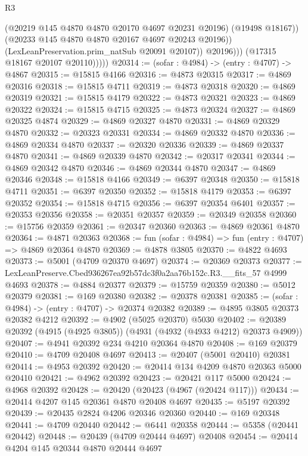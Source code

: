 \begin{lexlean}{R3}
\begin{coremodule}
                        (@20219 @145 @4870 @4870 @20170 @4697 @20231 @20196)
                        (@19498 @18167))
                      (@20233 @145 @4870 @4870 @20167 @4697 @20243 @20196))
                    (LexLeanPreservation.prim_natSub @20091 @20107))
                  @20196)))
            (@17315 @18167 @20107 @20110)))))
@20314 := (sofar : @4984) -> (entry : @4707) -> @4867
@20315 := @15815 @4166
@20316 := @4873 @20315
@20317 := @4869 @20316
@20318 := @15815 @4711
@20319 := @4873 @20318
@20320 := @4869 @20319
@20321 := @15815 @4179
@20322 := @4873 @20321
@20323 := @4869 @20322
@20324 := @15815 @4715
@20325 := @4873 @20324
@20327 := @4869 @20325 @4874
@20329 := @4869 @20327 @4870
@20331 := @4869 @20329 @4870
@20332 := @20323 @20331
@20334 := @4869 @20332 @4870
@20336 := @4869 @20334 @4870
@20337 := @20320 @20336
@20339 := @4869 @20337 @4870
@20341 := @4869 @20339 @4870
@20342 := @20317 @20341
@20344 := @4869 @20342 @4870
@20346 := @4869 @20344 @4870
@20347 := @4869 @20346
@20348 := @15818 @4166
@20349 := @6397 @20348
@20350 := @15818 @4711
@20351 := @6397 @20350
@20352 := @15818 @4179
@20353 := @6397 @20352
@20354 := @15818 @4715
@20356 := @6397 @20354 @6401
@20357 := @20353 @20356
@20358 := @20351 @20357
@20359 := @20349 @20358
@20360 := @15756 @20359
@20361 := @20347 @20360
@20363 := @4869 @20361 @4870
@20364 := @4871 @20363
@20368 := fun (sofar : @4984) => fun (entry : @4707) => @4869 @20364 @4870
@20369 := @4878 @3805
@20370 := @4822 @4693
@20373 := @5001 (@4709 @20370 @4697)
@20374 := @20369 @20373
@20377 := LexLeanPreserve.Cbed936267ea92b57dc3f0a2aa76b152c.R3.__fits_57 @4999 @4693
@20378 := @4884 @20377
@20379 := @15759 @20359
@20380 := @5012 @20379
@20381 := @169 @20380
@20382 := @20378 @20381
@20385 := (sofar : @4984) -> (entry : @4707) -> @20374 @20382
@20389 := @4895 @3805 @20373 @20382 @4212
@20392 := @4902 (@5025 @20370) @5030
@20402 := @20389 @20392 (@4915 (@4925 @3805)) (@4931 (@4932 (@4933 @4212) @20373 @4909))
@20407 := @4941 @20392 @234 @4210 @20364 @4870
@20408 := @169 @20379
@20410 := @4709 @20408 @4697
@20413 := @20407 (@5001 @20410) @20381
@20414 := @4953 @20392
@20420 := @20414 @134 @4209 @4870 @20363 @5000 @20410
@20421 := @4962 @20392
@20423 := @20421 @117 @5000
@20424 := @4968 @20392
@20428 := @20420 (@20423 (@4967 (@20424 @117)))
@20434 := @20414 @4207 @145 @20361 @4870 @20408 @4697
@20435 := @5197 @20392
@20439 := @20435 @2824 @4206 @20346 @20360
@20440 := @169 @20348
@20441 := @4709 @20440
@20442 := @6441 @20358
@20444 := @5358 (@20441 @20442)
@20448 := @20439 (@4709 @20444 @4697) @20408
@20454 := @20414 @4204 @145 @20344 @4870 @20444 @4697

\end{coremodule}
\end{lexlean}
